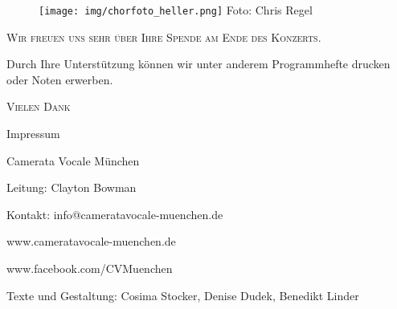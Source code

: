 \documentclass[11pt, ngermanm, titlepage]{article}
\begin{document}
	\pagebreak
	\centering
	\begin{figure}
		\texttt{[image: img/chorfoto\_heller.png]}
		\tiny{Foto: Chris Regel}
	\end{figure}
	\par\vspace{2cm}
	
	{\scshape\large Wir freuen uns sehr über Ihre Spende am Ende des Konzerts.\par
	Durch Ihre Unterstützung können wir unter anderem Programmhefte drucken oder Noten erwerben.\par}
	\vspace{1.5cm}
	{\scshape\Large Vielen Dank\par}
	\vfill
	{\small Impressum\par
		{\large Camerata Vocale München\par}
	Leitung: Clayton Bowman\par
	Kontakt: info@cameratavocale-muenchen.de\par
	www.cameratavocale-muenchen.de\par
	www.facebook.com/CVMuenchen\par
	Texte und Gestaltung: Cosima Stocker, Denise Dudek, Benedikt Linder}
	
\end{document}
